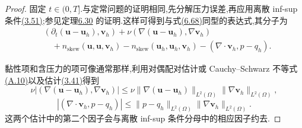 \begin{proof}
固定 $t\in(0,T]$.与定常问题的证明相同,先分解压力误差,再应用离散 inf-sup 条件\hyperref[eq:discrete-infsup-condition]{(3.51)};参见定理\hyperref[thm:steady-ns-fem-error-pressure]{6.30} 的证明.这样可得到与式\hyperref[eq:steady-ns-pressure-error-infsup]{(6.68)}同型的表达式,其分子为
\begin{equation}\label{eq:time-dependent-pressure-error-numerator}
\begin{aligned}
  &(\partial_t(\bm{u}-\bm{u}_h),\bm{v}_h)
  +\nu(\nabla(\bm{u}-\bm{u}_h),\nabla\bm{v}_h)\\
  &\quad+n_{\mathrm{skew}}(\bm{u},\bm{u},\bm{v}_h)
       -n_{\mathrm{skew}}(\bm{u}_h,\bm{u}_h,\bm{v}_h)
       -(\nabla\cdot\bm{v}_h,p-q_h).
\end{aligned}
\end{equation}

黏性项和含压力的项可像通常那样,利用对偶配对估计或 Cauchy--Schwarz 不等式\hyperref[eq:appendix-a-10]{(A.10)}以及估计\hyperref[eq:divergence-gradient-bound-h01]{(3.41)}得到
\begin{equation}\label{eq:time-dependent-pressure-error-viscous-bound}
  \nu\bigl|(\nabla(\bm{u}-\bm{u}_h),\nabla\bm{v}_h)\bigr|
  \le \nu\|\nabla(\bm{u}-\bm{u}_h)\|_{L^2(\Omega)}
       \|\nabla\bm{v}_h\|_{L^2(\Omega)},
\end{equation}
\begin{equation}\label{eq:time-dependent-pressure-error-pressure-bound}
  |(\nabla\cdot\bm{v}_h,p-q_h)|
  \le \|p-q_h\|_{L^2(\Omega)}
       \|\nabla\bm{v}_h\|_{L^2(\Omega)}.
\end{equation}
这两个估计中的第二个因子会与离散 inf-sup 条件分母中的相应因子约去.


\end{proof}
